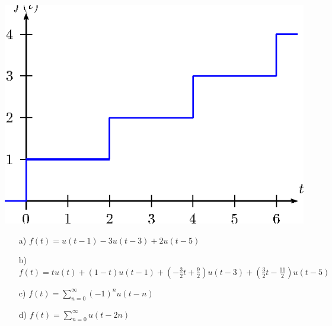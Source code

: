 \begin{exer}{\label{ex_Heaviside1}}
\begin{itemize}
\begin{center}
\includegraphics{cap_trans_int/pics/figura_23}\end{center}
\end{itemize}
\end{exer}
\begin{resp}
 \begin{itemize}
  \item[a)] $f(t)=u(t-1)-3u(t-3)+2u(t-5)$
    \item[b)] $f(t)=tu(t)+(1-t)u(t-1)+\left(-\frac{3}{2}t+\frac{9}{2}\right)u(t-3)+\left(\frac{3}{2}t-\frac{11}{2}\right)u(t-5)$
        \item[c)] $f(t)=\sum_{n=0}^\infty (-1)^n u(t-n)$
        \item[d)] $f(t)=\sum_{n=0}^\infty  u(t-2n)$
 \end{itemize}
\end{resp}

